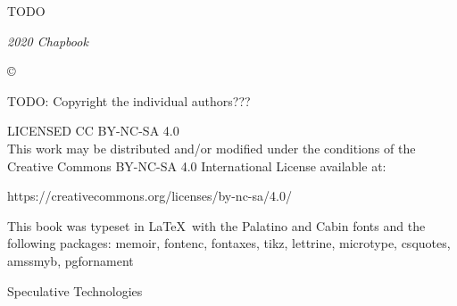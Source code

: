 



\pagestyle{empty}

\mainmatter
\raggedbottom

{
\null\vfill

\begin{flushleft}

{\small
TODO

\textit{2020 Chapbook}

© 

TODO: Copyright the individual authors???

\bigskip

LICENSED CC BY-NC-SA 4.0 \\
This work may be distributed and/or modified under the conditions of the Creative Commons BY-NC-SA 4.0 International License available at:
\begin{monotype}
https://creativecommons.org/licenses/by-nc-sa/4.0/
\end{monotype}

This book was typeset in \LaTeX\ with the Palatino and Cabin fonts and the following packages:
  memoir,
  fontenc,
  fontaxes,
  tikz,
  lettrine,
  microtype,
  csquotes,
  amssmyb,
  pgfornament
\bigskip
}
\end{flushleft}
}

\clearpage
\pagestyle{plain}

\begingroup%
\centering
\vspace*{24pt}
{\Huge Speculative Technologies}\\[\baselineskip]
{}\\[\baselineskip]
\vfill\null
\endgroup



{\setlength{\beforechapskip}{0pt}
\begin{KeepFromToc}
  \tableofcontents*
\end{KeepFromToc}
}


\clearpage

